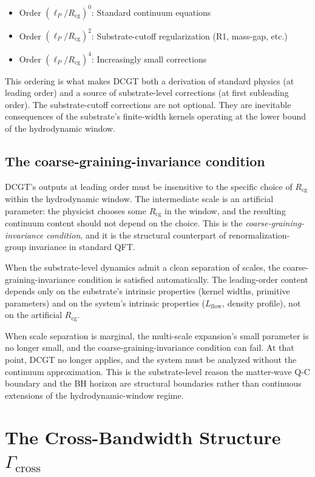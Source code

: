 \documentclass[11pt,a4paper]{article}
\begin{document}
\begin{itemize}[noitemsep]
  \item Order $(\ell_P/R_{\mathrm{cg}})^{0}$: Standard continuum equations
  \item Order $(\ell_P/R_{\mathrm{cg}})^{2}$: Substrate-cutoff regularization (R1, mass-gap, etc.)
  \item Order $(\ell_P/R_{\mathrm{cg}})^{4}$: Increasingly small corrections
\end{itemize}

This ordering is what makes DCGT both a derivation of standard physics (at leading order) and a source of substrate-level corrections (at first subleading order). The substrate-cutoff corrections are not optional. They are inevitable consequences of the substrate's finite-width kernels operating at the lower bound of the hydrodynamic window.

\subsection{The coarse-graining-invariance condition}

DCGT's outputs at leading order must be insensitive to the specific choice of $R_{\mathrm{cg}}$ within the hydrodynamic window. The intermediate scale is an artificial parameter: the physicist chooses some $R_{\mathrm{cg}}$ in the window, and the resulting continuum content should not depend on the choice. This is the \emph{coarse-graining-invariance condition}, and it is the structural counterpart of renormalization-group invariance in standard QFT.

When the substrate-level dynamics admit a clean separation of scales, the coarse-graining-invariance condition is satisfied automatically. The leading-order content depends only on the substrate's intrinsic properties (kernel widths, primitive parameters) and on the system's intrinsic properties ($L_{\mathrm{flow}}$, density profile), not on the artificial $R_{\mathrm{cg}}$.

When scale separation is marginal, the multi-scale expansion's small parameter is no longer small, and the coarse-graining-invariance condition can fail. At that point, DCGT no longer applies, and the system must be analyzed without the continuum approximation. This is the substrate-level reason the matter-wave Q-C boundary and the BH horizon are structural boundaries rather than continuous extensions of the hydrodynamic-window regime.

\section{The Cross-Bandwidth Structure $\Gamma_{\mathrm{cross}}$}
\end{document}
